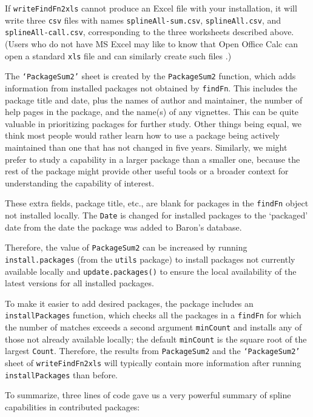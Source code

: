 If {\tt writeFindFn2xls} cannot produce an Excel file with
your installation, it will write three {\tt csv} files with
names {\tt splineAll-sum.csv}, {\tt splineAll.csv}, and
{\tt splineAll-call.csv}, corresponding to the three
worksheets described above. (Users who do not have MS Excel
may like to know that Open Office Calc can open a standard
{\tt xls} file and can similarly create such files
\citep{CALC09MAN}.)

The {\tt `PackageSum2'} sheet is created by the
{\tt PackageSum2} function, which adds information from
installed packages not obtained by
{\tt findFn}.  This includes the package title and date, plus
the names of author and maintainer, the number of help pages 
in the package,
and the name(s) of any vignettes.  This can be quite
valuable in prioritizing packages for further study.
Other things being equal, we think most people would
rather learn how to use a package being actively maintained
than one that has not changed in five years.  Similarly,
we might prefer to study a capability in a larger package
than a smaller one, because the rest of the package might
provide other useful tools or a broader context for
understanding the capability of interest.

These extra fields, package title, etc., are blank for
packages in the {\tt findFn} object not installed locally.
The {\tt Date} is changed for installed packages 
to the `packaged' date from the date the 
package was added to Baron's database.  

Therefore, the value of {\tt PackageSum2} can be
increased by running {\tt install.packages} (from the
{\tt utils} package) to install packages not currently
available locally and {\tt update.packages()} to ensure the 
local availability of the latest versions for all 
installed packages.  

To make it easier to add desired packages, 
the  package includes
an {\tt installPackages} function, which checks all the
packages in a {\tt findFn} for which
the number of matches exceeds a second argument {\tt minCount}
and installs any of those not already available locally;  the
default {\tt minCount} is the square root of the largest
{\tt Count}.  Therefore, the results from {\tt PackageSum2} and the
{\tt `PackageSum2'} sheet of {\tt writeFindFn2xls} will typically
contain more information after running {\tt installPackages}
than before.

To summarize, three lines of code gave us a very powerful
summary of spline capabilities in contributed \R{}
packages:

